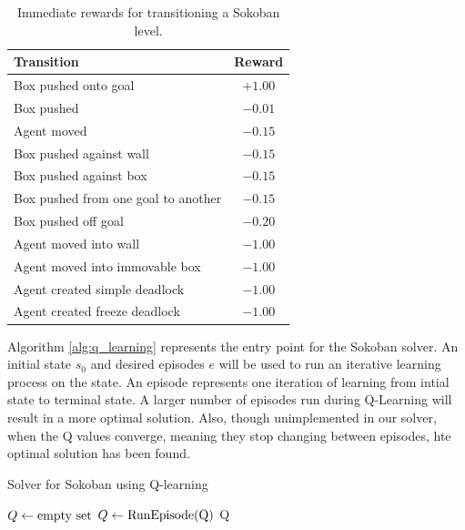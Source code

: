 \documentclass[times, 10pt,twocolumn]{article}
\begin{document}
\begin{table}[htbp]
  \centering
  \begin{tabular}{l c} \hline\hline
    Transition & Reward \\ \hline
    Box pushed onto goal & $+1.00$ \\
    Box pushed & $-0.01$ \\
    Agent moved & $-0.15$ \\
    Box pushed against wall & $-0.15$ \\
    Box pushed against box & $-0.15$ \\
    Box pushed from one goal to another & $-0.15$ \\
    Box pushed off goal & $-0.20$ \\ 
    Agent moved into wall & $-1.00$ \\
    Agent moved into immovable box & $-1.00$ \\
    Agent created simple deadlock & $-1.00$ \\
    Agent created freeze deadlock & $-1.00$ \\ \hline\hline
  \end{tabular}
  \caption{Immediate rewards for transitioning a Sokoban level.}
  \label{table:rewards}
\end{table}


Algorithm \ref{alg:q_learning} represents the entry point for the Sokoban solver.  An initial state $s_0$ and desired episodes $e$ will be used to run an iterative learning process on the state.  An episode represents one iteration of learning from intial state to terminal state.  A larger number of episodes run during Q-Learning will result in a more optimal solution.  Also, though unimplemented in our solver, when the Q values converge, meaning they stop changing between episodes, hte optimal solution has been found.

\begin{algorithm}
  \caption{Solver for Sokoban using Q-learning}
  \begin{algorithmic}[2]
      \State $Q\gets \textnormal{empty set}$
        \State $Q\gets \textnormal{RunEpisode(Q)}$
      \EndFor
      \Return Q
    \EndFunction
  \end{algorithmic}
\label{alg:q_learning}
\end{algorithm}
\end{document}
